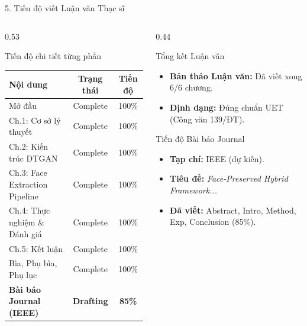 \documentclass[aspectratio=169,11pt]{beamer}
\begin{document}
\begin{frame}{5. Tiến độ viết Luận văn Thạc sĩ}

\begin{columns}[T]
\begin{column}{0.53\textwidth}
\small

\begin{block}{Tiến độ chi tiết từng phần}
\centering
\scriptsize
\def\arraystretch{1.05}
\begin{tabular}{lcc}
\toprule
\textbf{Nội dung} & \textbf{Trạng thái} & \textbf{Tiến độ} \\
\midrule
Mở đầu & Complete & 100\% \\
Ch.1: Cơ sở lý thuyết & Complete & 100\% \\
Ch.2: Kiến trúc DTGAN & Complete & 100\% \\
Ch.3: Face Extraction Pipeline & Complete & 100\% \\
Ch.4: Thực nghiệm \& Đánh giá & Complete & 100\% \\
Ch.5: Kết luận & Complete & 100\% \\
Bìa, Phụ bìa, Phụ lục & Complete & 100\% \\
\midrule
\textbf{Bài báo Journal (IEEE)} & \textbf{Drafting} & \textbf{85\%} \\
\bottomrule
\end{tabular}
\end{block}

\end{column}
\begin{column}{0.44\textwidth}
\small

\begin{exampleblock}{Tổng kết Luận văn}
\begin{itemize}\itemsep=2pt
    \item \textbf{Bản thảo Luận văn:} Đã viết xong 6/6 chương.
    \item \textbf{Định dạng:} Đúng chuẩn UET (Công văn 139/ĐT).
\end{itemize}
\end{exampleblock}

\begin{block}{Tiến độ Bài báo Journal}
\begin{itemize}\itemsep=2pt
    \item \textbf{Tạp chí:} IEEE (dự kiến).
    \item \textbf{Tiêu đề:} \textit{Face-Preserved Hybrid Framework...}
    \item \textbf{Đã viết:} Abstract, Intro, Method, Exp, Conclusion (85\%).
\end{itemize}
\end{block}

\end{column}
\end{columns}

\end{frame}
\end{document}

